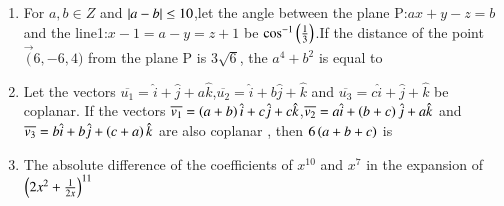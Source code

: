 \documentclass[journal]{IEEEtran}
\numberwithin{equation}{enumi}
\numberwithin{figure}{enumi}
\begin{document}
\begin{enumerate}
    \item For $a,b \in Z$ and $\left\vert a-b\right\vert \leq 10$,let the angle between the plane P:$ax+y-z=b$ and the line1:$x-1=a-y=z+1$ be $\cos^{-1}\left(\frac{1}{3}\right)$.If the distance of the point $\vec(6,-6,4)$ from the plane P is $3\sqrt{6}$, the $a^4+b^2$ is equal to
        \hfill{}\\
       \begin{enumerate}    
              \end{enumerate}    

    \item Let the vectors $\overline{u_1}=\hat{i}+\hat{j}+a\hat{k}$,$\overline{u_2}=\hat{i}+b\hat{j}+\hat{k}$ and $\overline{u_3}=c\hat{i}+\hat{j}+\hat{k}$ be coplanar. If the vectors $\overline{v_1}=\left(a+b\right)\hat{i}+c\hat{j}+c\hat{k}$,$\overline{v_2}=a\hat{i}+\left(b+c\right)\hat{j}+a\hat{k}$ and $\overline{v_3}=b\hat{i}+b\hat{j}+\left(c+a\right)\hat{k}$ are also coplanar , then $6\left(a+b+c\right)$ is 
        \hfill{}\\
        \begin{enumerate}    
              \end{enumerate}    
    \item The absolute  difference of the coefficients of $x^{10}$ and $x^7$ in the expansion of $\left(2x^2+\frac{1}{2x}\right)^{11}$
        \hfill{}\\
       \begin{enumerate}    
              \end{enumerate}    



\end{enumerate}
\end{document}
